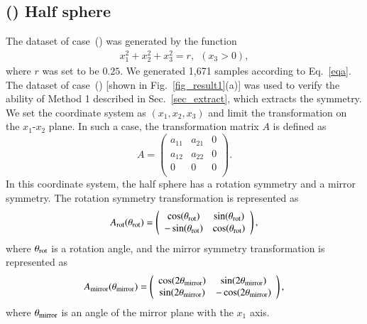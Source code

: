 \documentclass[preprint,
bibnotes,
 amsmath,amssymb,
 aps,
]{revtex4-1}
\newcounter{num}
\newcommand{\rnum}[1]{\setcounter{num}{#1}\roman{num}}
\begin{document}
\subsection*{(\rnum{1}) Half sphere}
The dataset of case~(\rnum{1}) was generated by the function
\begin{eqnarray}
\label{eqa}
x_1^2+x_2^2+x_3^2 = r,\:\: (x_3 > 0),
\end{eqnarray}
where $r$ was set to be $0.25$. 
We generated 1,671 samples according to Eq.~\eqref{eqa}. 
The dataset of case~(\rnum{1}) [shown in Fig.~\ref{fig_result1}(a)] was used to verify the ability of Method 1 described in Sec.~\ref{sec_extract}, which extracts the symmetry. 
We set the coordinate system as $(x_1, x_2, x_3)$ and limit the transformation on the $x_1$-$x_2$ plane. 
In such a case, the transformation matrix $A$ is defined as
\begin{equation}
\label{r1a}
A = 
\left(
    \begin{array}{ccc}
      a_{11} & a_{21} & 0\\
      a_{12} & a_{22} & 0\\
      0 & 0 & 0\\
    \end{array}
  \right). 
\end{equation} 
In this coordinate system, the half sphere has a rotation symmetry and a mirror symmetry. The rotation symmetry transformation is represented as
\begin{equation}
A_{\rm rot}(\theta_{\rm rot}) = 
\left(
    \begin{array}{cc}
      \cos(\theta_{\rm rot}) & \sin(\theta_{\rm rot})\\
      -\sin(\theta_{\rm rot}) & \cos(\theta_{\rm rot})\\
    \end{array}
  \right), 
\end{equation} 
where $\theta_{\rm rot}$ is a rotation angle, and the mirror symmetry transformation is represented as 
\begin{equation}
A_{\rm mirror}(\theta_{\rm mirror}) = 
\left(
    \begin{array}{cc}
      \cos(2\theta_{\rm mirror}) & \sin(2\theta_{\rm mirror})\\
      \sin(2\theta_{\rm mirror}) & -\cos(2\theta_{\rm mirror})\\
    \end{array}
  \right), 
\end{equation}
where $\theta_{\rm mirror}$ is an angle of the mirror plane with the $x_1$ axis. 
\end{document}
